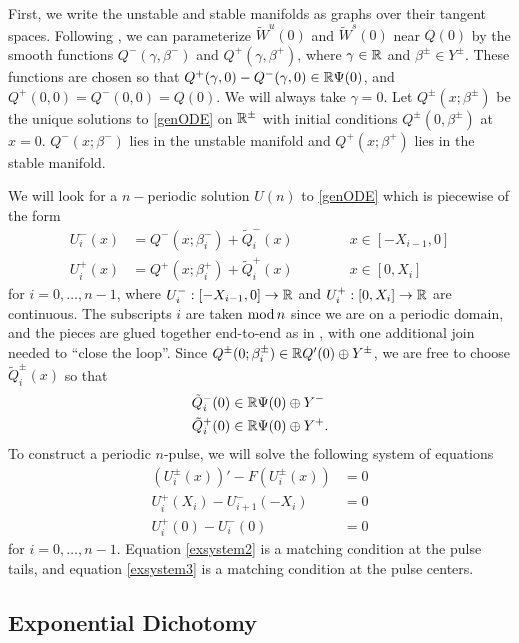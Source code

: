 \documentclass[12pt]{elsarticle}
\theoremstyle{plain}
\theoremstyle{definition}
\theoremstyle{remark}
\numberwithin{theorem}{section}
\numberwithin{equation}{section}
\begin{document}
First, we write the unstable and stable manifolds as graphs over their tangent spaces. Following \cite{Sandstede1997}, we can parameterize $\tilde{W}^u(0)$ and $\tilde{W}^s(0)$ near $Q(0)$ by the smooth functions $Q^-(\gamma, \beta^-)$ and $Q^+(\gamma, \beta^+)$, where $\gamma \in \mathbb{R}$ and $\beta^\pm \in Y^\pm$. These functions are chosen so that $Q^+(\gamma, 0) - Q^-(\gamma, 0) \in \mathbb{R} \Psi(0)$, and $Q^+(0, 0) = Q^-(0, 0) = Q(0)$. We will always take $\gamma = 0$. Let $Q^\pm(x; \beta^\pm)$ be the unique solutions to \cref{genODE} on $\mathbb{R}^\pm$ with initial conditions $Q^\pm(0, \beta^\pm)$ at $x = 0$. $Q^-(x; \beta^-)$ lies in the unstable manifold and $Q^+(x; \beta^+)$ lies in the stable manifold. 

We will look for a $n-$periodic solution $U(n)$ to \cref{genODE} which is piecewise of the form
\begin{equation}\label{Upiecewise}
\begin{aligned}
U_i^-(x) &= Q^-(x; \beta_i^-) + \tilde{Q}_i^-(x) \qquad\qquad x \in [-X_{i-1}, 0] \\
U_i^+(x) &= Q^+(x; \beta_i^+) + \tilde{Q}_i^+(x) \qquad\qquad x \in [0, X_i]
\end{aligned}
\end{equation}
for $i = 0, \dots, n-1$, where $U_i^-: [-X_{i-1}, 0] \rightarrow \mathbb{R}$ and $U_i^+: [0, X_i] \rightarrow \mathbb{R}$ are continuous. The subscripts $i$ are taken $\mathop\mathrm{mod}\nolimits n$ since we are on a periodic domain, and the pieces are glued together end-to-end as in \cite{Sandstede1998}, with one additional join needed to ``close the loop''. Since $Q^\pm(0; \beta_i^\pm) \in \mathbb{R} Q'(0) \oplus Y^\pm$, we are free to choose $\tilde{Q}_i^\pm(x)$ so that
\begin{align*}
\tilde{Q}_i^-(0) &\in \mathbb{R} \Psi(0) \oplus Y^- \\
\tilde{Q}_i^+(0) &\in \mathbb{R} \Psi(0) \oplus Y^+.
\end{align*}
To construct a periodic $n$-pulse, we will solve the following system of equations
\begin{align}
(U_i^\pm(x))' - F(U_i^\pm(x)) &= 0 \label{exsystem1} \\
U_i^+(X_i) - U_{i+1}^-(-X_i) &= 0 \label{exsystem2} \\
U_i^+(0) - U_i^-(0) &= 0 \label{exsystem3}
\end{align}
for $i = 0, \dots, n-1$. Equation \cref{exsystem2} is a matching condition at the pulse tails, and equation \cref{exsystem3} is a matching condition at the pulse centers.

\subsection{Exponential Dichotomy}\label{sec:existdichot}
\end{document}
